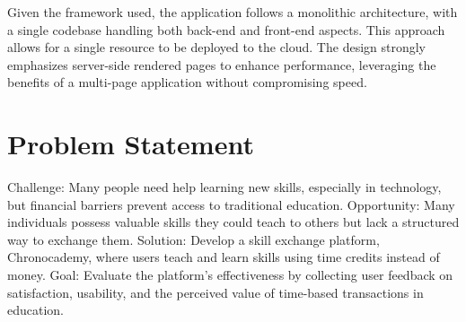 Given the framework used, the application follows a monolithic architecture, with a single codebase handling both back-end and front-end aspects.
This approach allows for a single resource to be deployed to the cloud.
The design strongly emphasizes server-side rendered pages to enhance performance, leveraging the benefits of a multi-page application without compromising speed.

\section{Problem Statement}\label{sec:problem-statement}
Challenge: Many people need help learning new skills, especially in technology, but financial barriers prevent access to traditional education.
\newline
\newline
Opportunity: Many individuals possess valuable skills they could teach to others but lack a structured way to exchange them.
\newline
\newline
Solution: Develop a skill exchange platform, Chronocademy, where users teach and learn skills using time credits instead of money.
\newline
\newline
Goal: Evaluate the platform's effectiveness by collecting user feedback on satisfaction, usability, and the perceived value of time-based transactions in education.
